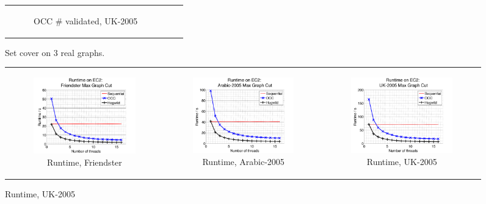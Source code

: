 \begin{figure}[ht]
\begin{tabular}{ccc}
\begin{subfigure}[b]{0.31\textwidth}
			\caption{OCC \# validated, UK-2005}
			\label{appfig:validated_OCC_uk2005_setcover}
	  \end{subfigure} \\
  \end{tabular}
  \caption{Set cover on 3 real graphs.}
\end{figure}



\begin{figure}[ht]
  \centering
  \begin{tabular}{ccc}
	  \begin{subfigure}[b]{0.31\textwidth}
	  	\includegraphics[width=150pt]{images/runtime_friendster10M_maxgraphcut.png}
			\caption{Runtime, Friendster}
			\label{appfig:runtime_friendster10M_maxgraphcut}
	  \end{subfigure} &
	  \begin{subfigure}[b]{0.31\textwidth}
	  	\includegraphics[width=150pt]{images/runtime_arabic2005_maxgraphcut.png}
			\caption{Runtime, Arabic-2005}
			\label{appfig:runtime_arabic2005_maxgraphcut}
	  \end{subfigure} &
	  \begin{subfigure}[b]{0.31\textwidth}
	  	\includegraphics[width=150pt]{images/runtime_uk2005_maxgraphcut.png}
			\caption{Runtime, UK-2005}
			\label{appfig:runtime_uk2005_maxgraphcut}

\end{subfigure}
\end{tabular}
\end{figure}
